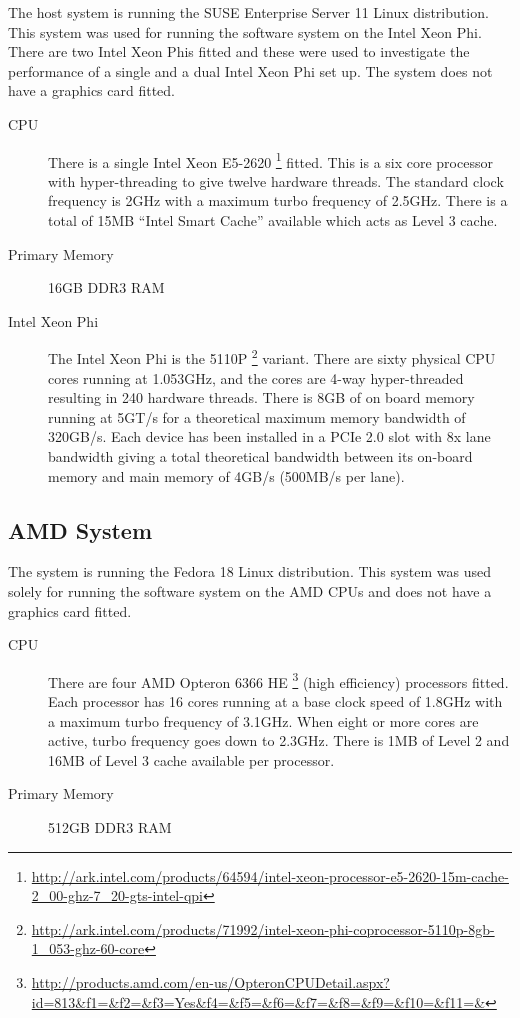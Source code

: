 The host system is running the SUSE Enterprise Server 11 Linux distribution.
This system was used for running the software system on the Intel Xeon Phi.
There are two Intel Xeon Phis fitted and these were used to investigate the
performance of a single and a dual Intel Xeon Phi set up. The system does not
have a graphics card fitted.

\begin{description}

\item[CPU] There is a single Intel Xeon E5-2620
\footnote{\url{http://ark.intel.com/products/64594/intel-xeon-processor-e5-2620-15m-cache-2_00-ghz-7_20-gts-intel-qpi}}
fitted. This is a six core processor with hyper-threading to give twelve
hardware threads. The standard clock frequency is 2GHz with a maximum turbo
frequency of 2.5GHz. There is a total of 15MB ``Intel Smart Cache'' available
which acts as Level 3 cache.

\item[Primary Memory] 16GB DDR3 RAM

\item[Intel Xeon Phi] The Intel Xeon Phi is the 5110P
\footnote{\url{http://ark.intel.com/products/71992/intel-xeon-phi-coprocessor-5110p-8gb-1_053-ghz-60-core}}
variant. There are sixty physical CPU cores running at 1.053GHz, and the cores
are 4-way hyper-threaded resulting in 240 hardware threads. There is 8GB of on
board memory running at 5GT/s for a theoretical maximum memory bandwidth of
320GB/s. Each device has been installed in a PCIe 2.0 slot with 8x lane
bandwidth giving a total theoretical bandwidth between its on-board memory and
main memory of 4GB/s (500MB/s per lane).

\end{description}

\subsection{AMD System}

The system is running the Fedora 18 Linux distribution. This system was used
solely for running the software system on the AMD CPUs and does not have a
graphics card fitted.

\begin{description}

\item[CPU] There are four AMD Opteron 6366 HE
\footnote{\url{http://products.amd.com/en-us/OpteronCPUDetail.aspx?id=813&f1=&f2=&f3=Yes&f4=&f5=&f6=&f7=&f8=&f9=&f10=&f11=&}}
(high efficiency) processors fitted. Each processor has 16 cores running at a
base clock speed of 1.8GHz with a maximum turbo frequency of 3.1GHz. When eight
or more cores are active, turbo frequency goes down to 2.3GHz. There is 1MB of
Level 2 and 16MB of Level 3 cache available per processor.

\item[Primary Memory] 512GB DDR3 RAM

\end{description}

